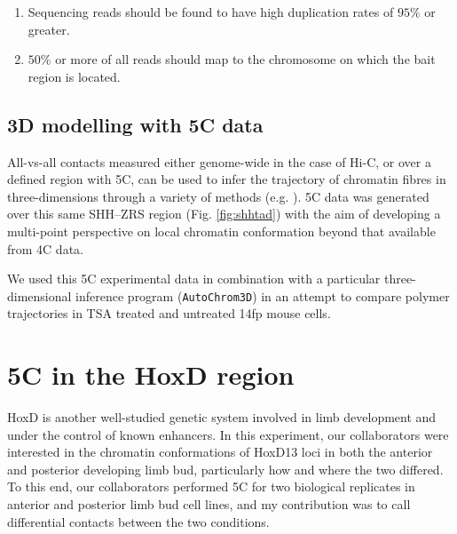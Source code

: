 \documentclass[a4paper,11pt,oneside]{book}
\begin{document}
\begin{enumerate}
\item Sequencing reads should be found to have high duplication rates of $95\%$ or greater.
\item $50\%$ or more of all reads should map to the chromosome on which the bait region is located.
\end{enumerate}

\subsection{3D modelling with 5C data}

All-vs-all contacts measured either genome-wide in the case of Hi-C, or over a defined region with 5C, can be used to infer the trajectory of chromatin fibres in three-dimensions through a variety of methods (e.g. \cite{Bau2011a, Hu2013a, Varoquaux2014a, Lesne2014, Trieu2014, Peng2013, Ay2014b, Caudai2015}). 5C data was generated over this same SHH--ZRS region (Fig. \ref{fig:shhtad}) with the aim of developing a multi-point perspective on local chromatin conformation beyond that available from 4C data.

We used this 5C experimental data in combination with a particular three-dimensional inference program  (\texttt{AutoChrom3D}\cite{Peng2013}) in an attempt to compare polymer trajectories in TSA treated and untreated 14fp mouse cells.

\section{5C in the HoxD region}

HoxD is another well-studied genetic system involved in limb development and under the control of known enhancers. In this experiment, our collaborators were interested in the chromatin conformations of HoxD13 loci in both the anterior and posterior developing limb bud, particularly how and where the two differed. To this end, our collaborators performed 5C for two biological replicates in anterior and posterior limb bud cell lines, and my contribution was to call differential contacts between the two conditions.



\end{document}
